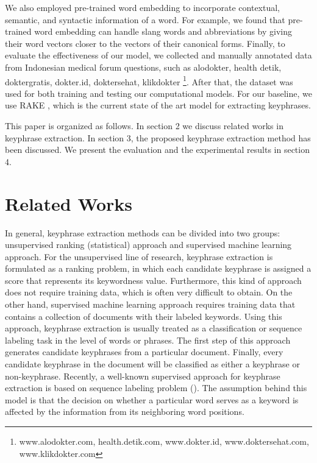 We also employed pre-trained word embedding to incorporate contextual, semantic, and syntactic information of a word. For example, we found that pre-trained word embedding can handle slang words and abbreviations by giving their word vectors closer to the vectors of their canonical forms. Finally, to evaluate the effectiveness of our model, we collected and manually annotated data from Indonesian medical forum questions, such as alodokter, health detik, doktergratis, dokter.id, doktersehat, klikdokter \footnote{www.alodokter.com, health.detik.com, www.dokter.id, www.doktersehat.com, www.klikdokter.com}. After that, the dataset was used for both training and testing our computational models. For our baseline, we use RAKE  \cite{rake}, which is the current state of the art model for extracting keyphrases.


This paper is organized as follows.  In section 2 we discuss related works in keyphrase extraction. In section 3, the proposed keyphrase extraction method has been discussed. We present the evaluation and the experimental results in section 4. 

\section{Related Works}
In general, keyphrase extraction methods can be divided into two groups: unsupervised ranking (statistical) approach and supervised machine learning approach. For the unsupervised line of research, keyphrase extraction is formulated as a ranking problem, in which each candidate keyphrase is assigned a score that represents its keywordness value. Furthermore, this kind of approach does not require training data, which is often very difficult to obtain. On the other hand, supervised machine learning approach requires training data that contains a collection of documents with their labeled keywords. Using this approach, keyphrase extraction is usually treated as a classification or sequence labeling task in the level of words or phrases. The first step of this approach generates candidate keyphrases from a particular document. Finally, every candidate keyphrase in the document will be classified as either a keyphrase or non-keyphrase. Recently, a well-known supervised approach for keyphrase extraction is based on sequence labeling problem (\cite{zhang2008automatic}\cite{cao2010automatically}\cite{zhang2016keyphrase}). The assumption behind this model is that the decision on whether a particular word serves as a keyword is affected by the information from its neighboring word positions.

